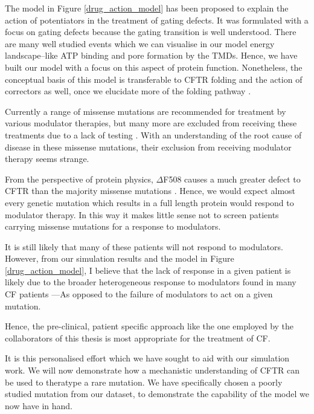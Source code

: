 The model in Figure \ref {drug_action_model} has been proposed to explain the action of potentiators in the treatment of gating defects. It was formulated with a focus on gating defects because the gating transition is well understood. There are many well studied events which we can visualise in our model energy landscape--like ATP binding and pore formation by the TMDs. Hence, we have built our model with a focus on this aspect of protein function. Nonetheless, the conceptual basis of this model is transferable to CFTR folding and the action of correctors as well, once we elucidate more of the folding pathway \cite{krainer2018, kleizen2021, kleizen2020, padanyi2022, fiedorczuk2022}. 

Currently a range of missense mutations are recommended for treatment by various modulator therapies, but many more are excluded from receiving these treatments due to a lack of testing \cite{trikafta_FDA_info, kalydeco_FDA_approval, vangoor2014}. With an understanding of the root cause of disease in these missense mutations, their exclusion from receiving modulator therapy seems strange.

From the perspective of protein physics, $\Delta$F508 causes a much greater defect to CFTR than the majority missense mutations \cite{bahia2021}. Hence, we would expect almost every genetic mutation which results in a full length protein would respond to modulator therapy. In this way it makes little sense not to screen patients carrying missense mutations for a response to modulators. 

It is still likely that many of these patients will not respond to modulators. However, from our simulation results and the model in Figure \ref{drug_action_model}, I believe that the lack of response  in a given patient is likely due to the broader heterogeneous response to modulators found in many CF patients \cite{boyle2014, donaldson2018, keating2018, matthes2018}---As opposed to the failure of modulators to act on a given mutation. 

Hence, the pre-clinical, patient specific approach like the one employed by the collaborators of this thesis is most appropriate for the treatment of CF. 

It is this personalised effort which we have sought to aid with our simulation work. We will now demonstrate how a mechanistic understanding of CFTR can be used to theratype a rare mutation. We have specifically chosen a poorly studied mutation from our dataset, to demonstrate the capability of the model we now have in hand. 

